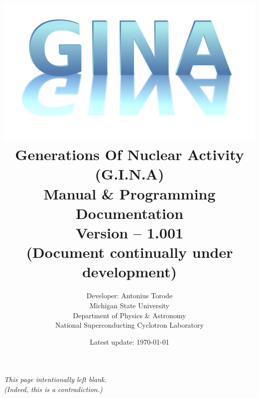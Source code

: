 \documentclass[openany,a4paper,11pt]{book}
\title{\includegraphics[scale =0.5]{./Images/gina.png} \\ Generations Of Nuclear Activity (G.I.N.A) \\  Manual \& Programming Documentation \\ Version -- 1.001 \\ (Document continually under development) \\ \vspace{1cm}  
}
\author{Developer: Antonius Torode \\ Michigan State University \\ Department of Physics \& Astronomy \\ National Superconducting Cyclotron Laboratory}
\date{Latest update: \today}
\begin{document}
\frontmatter
\maketitle

\tableofcontents
\newpage
\vspace*{\fill}
\begin{center}
	\textit{This page intentionally left blank. \\ (Indeed, this is a contradiction.)}
\end{center}
\vspace*{\fill}

\mainmatter
\pagestyle{fancy}
\fancyhf{}
\fancyhead[RO, LE]{\thepage}









\backmatter


\end{document}
